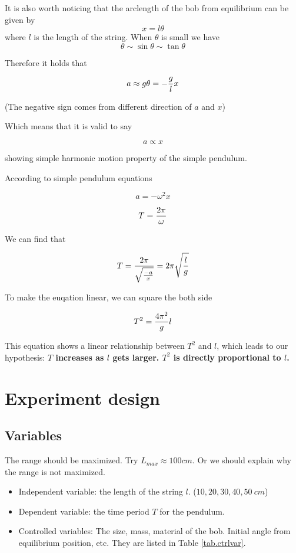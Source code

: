\documentclass[a4paper]{article}
\begin{document}
It is also worth noticing that the arclength of the bob from equilibrium can be given by $$x = l\theta$$ where $l$ is the length of the string. When $\theta$ is small we have $$\theta \sim \sin \theta \sim \tan \theta$$

Therefore it holds that

$$a \approx g\theta = -{g\over l} x $$

(The negative sign comes from different direction of $a$ and $x$)

Which means that it is valid to say

$$a \propto x$$

showing simple harmonic motion property of the simple pendulum.

According to simple pendulum equations 

$$a = -\omega^2 x$$

$$T = {2\pi \over \omega}$$

We can find that 

$$T = {2\pi\over \sqrt{-a\over x}} = 2\pi\sqrt{l\over g}$$

To make the euqation linear, we can square the both side

$$T^2 = {4\pi^2\over g}l$$

This equation shows a linear relationship between $T^2$ and $l$, which leads to our hypothesis: \textbf{$T$ increases as $l$ gets larger. $T^2$ is directly proportional to $l$.}

\section{Experiment design}

\subsection{Variables}

\begin{tcolorbox}[title = Note]
    The range should be maximized. Try $L_{max} \approx 100cm$.
    Or we should explain why the range is not maximized. 
\end{tcolorbox}

\begin{itemize}
    \item Independent variable: the length of the string $l$. ($10, 20, 30, 40, 50 \SI{}{cm}$)
    \item Dependent variable: the time period $T$ for the pendulum.
    \item Controlled variables: The size, mass, material of the bob. Initial angle from equilibrium position, etc. They are listed in Table \ref{tab.ctrlvar}.
\end{itemize}
\end{document}
